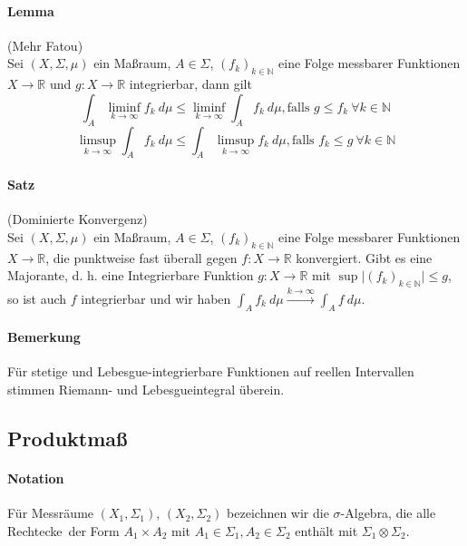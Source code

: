 \documentclass[12pt,a4paper,fleqn]{article}
\begin{document}
\paragraph{Lemma} (Mehr Fatou)\\
Sei $(X, \Sigma, \mu)$ ein Maßraum, $A \in \Sigma$, $(f_k)_{k \in \mathbb{N}}$ eine Folge messbarer Funktionen $X \rightarrow \mathbb{R}$ und $g\colon X \rightarrow \mathbb{R}$ integrierbar, dann gilt
\begin{displaymath}
\int_A \liminf_{k \rightarrow\infty} f_k\ d\mu \leq \liminf_{k \rightarrow \infty} \int_A f_k\ d\mu, \text{falls } g \leq f_k\ \forall k \in \mathbb{N}
\end{displaymath}
\begin{displaymath}
\limsup_{k \rightarrow \infty} \int_A f_k\ d\mu \leq \int_A \limsup_{k \rightarrow \infty} f_k\ d\mu, \text{falls } f_k \leq g\ \forall k \in \mathbb{N}
\end{displaymath}

\paragraph{Satz} (Dominierte Konvergenz)\\
Sei $(X, \Sigma, \mu)$ ein Maßraum, $A \in \Sigma$, $(f_k)_{k \in \mathbb{N}}$ eine Folge messbarer Funktionen $X \rightarrow \mathbb{R}$, die punktweise fast überall gegen $f\colon X \rightarrow \mathbb{R}$ konvergiert. Gibt es eine Majorante, d. h. eine Integrierbare Funktion $g\colon X \rightarrow \mathbb{R}$ mit $\sup \vert (f_k)_{k \in \mathbb{N}} \vert \leq g$, so ist auch $f$ integrierbar und wir haben $\int_A f_k\ d\mu \xrightarrow{k \rightarrow \infty} \int_A f\ d\mu$.

\paragraph{Bemerkung} Für stetige und Lebesgue-integrierbare Funktionen auf reellen Intervallen stimmen Riemann- und Lebesgueintegral überein.

\subsection{Produktmaß}

\paragraph{Notation} Für Messräume $(X_1, \Sigma_1)$, $(X_2, \Sigma_2)$ bezeichnen wir die $\sigma$-Algebra, die alle \glqq Rechtecke\grqq\ der Form $A_1 \times A_2$ mit $A_1 \in \Sigma_1, A_2 \in \Sigma_2$ enthält mit $\Sigma_1 \otimes \Sigma_2$.
\end{document}
